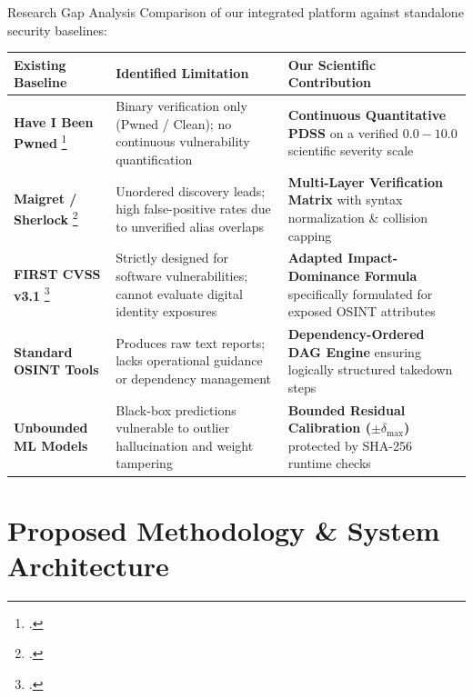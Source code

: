 \documentclass[aspectratio=169,10pt]{beamer}
\begin{document}
\begin{frame}{Research Gap Analysis}
  \footnotesize
  Comparison of our integrated platform against standalone security baselines:
  
  \vspace{0.15cm}
  \begin{table}
    \centering
    \scriptsize
    \begin{tabular}{>{\raggedright\arraybackslash}p{2.3cm} >{\raggedright\arraybackslash}p{3.7cm} >{\raggedright\arraybackslash}p{4.8cm}}
      \toprule
      \textbf{Existing Baseline} & \textbf{Identified Limitation} & \textbf{Our Scientific Contribution} \\
      \midrule
      \textbf{Have I Been Pwned} \footcite{hibp2025} & Binary verification only (Pwned / Clean); no continuous vulnerability quantification & \textbf{Continuous Quantitative PDSS} on a verified $0.0 - 10.0$ scientific severity scale \\
      \textbf{Maigret / Sherlock} \footcite{soxoj2020maigret, dushantha2018sherlock} & Unordered discovery leads; high false-positive rates due to unverified alias overlaps & \textbf{Multi-Layer Verification Matrix} with syntax normalization \& collision capping \\
      \textbf{FIRST CVSS v3.1} \footcite{cvss2019} & Strictly designed for software vulnerabilities; cannot evaluate digital identity exposures & \textbf{Adapted Impact-Dominance Formula} specifically formulated for exposed OSINT attributes \\
      \textbf{Standard OSINT Tools} & Produces raw text reports; lacks operational guidance or dependency management & \textbf{Dependency-Ordered DAG Engine} ensuring logically structured takedown steps \\
      \textbf{Unbounded ML Models} & Black-box predictions vulnerable to outlier hallucination and weight tampering & \textbf{Bounded Residual Calibration ($\pm \delta_{\text{max}}$)} protected by SHA-256 runtime checks \\
      \bottomrule
    \end{tabular}
  \end{table}
\end{frame}

\section{Proposed Methodology \& System Architecture}
\end{document}
